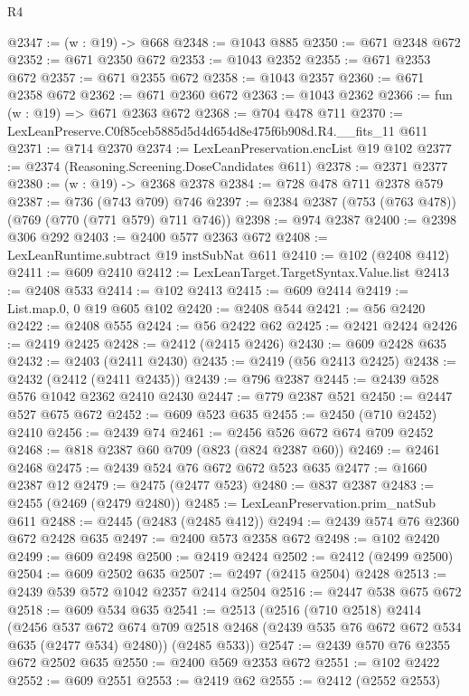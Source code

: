 \begin{lexlean}{R4}
\begin{coremodule}
@2347 := (w : @19) -> @668
@2348 := @1043 @885
@2350 := @671 @2348 @672
@2352 := @671 @2350 @672
@2353 := @1043 @2352
@2355 := @671 @2353 @672
@2357 := @671 @2355 @672
@2358 := @1043 @2357
@2360 := @671 @2358 @672
@2362 := @671 @2360 @672
@2363 := @1043 @2362
@2366 := fun (w : @19) => @671 @2363 @672
@2368 := @704 @478 @711
@2370 := LexLeanPreserve.C0f85ceb5885d5d4d654d8e475f6b908d.R4.__fits_11 @611
@2371 := @714 @2370
@2374 := LexLeanPreservation.encList @19 @102
@2377 := @2374 (Reasoning.Screening.DoseCandidates @611)
@2378 := @2371 @2377
@2380 := (w : @19) -> @2368 @2378
@2384 := @728 @478 @711 @2378 @579
@2387 := @736 (@743 @709) @746
@2397 := @2384 @2387 (@753 (@763 @478)) (@769 (@770 (@771 @579) @711 @746))
@2398 := @974 @2387
@2400 := @2398 @306 @292
@2403 := @2400 @577 @2363 @672
@2408 := LexLeanRuntime.subtract @19 instSubNat @611
@2410 := @102 (@2408 @412)
@2411 := @609 @2410
@2412 := LexLeanTarget.TargetSyntax.Value.list
@2413 := @2408 @533
@2414 := @102 @2413
@2415 := @609 @2414
@2419 := List.map.{0, 0} @19 @605 @102
@2420 := @2408 @544
@2421 := @56 @2420
@2422 := @2408 @555
@2424 := @56 @2422 @62
@2425 := @2421 @2424
@2426 := @2419 @2425
@2428 := @2412 (@2415 @2426)
@2430 := @609 @2428 @635
@2432 := @2403 (@2411 @2430)
@2435 := @2419 (@56 @2413 @2425)
@2438 := @2432 (@2412 (@2411 @2435))
@2439 := @796 @2387
@2445 := @2439 @528 @576 @1042 @2362 @2410 @2430
@2447 := @779 @2387 @521
@2450 := @2447 @527 @675 @672
@2452 := @609 @523 @635
@2455 := @2450 (@710 @2452) @2410
@2456 := @2439 @74
@2461 := @2456 @526 @672 @674 @709 @2452
@2468 := @818 @2387 @60 @709 (@823 (@824 @2387 @60))
@2469 := @2461 @2468
@2475 := @2439 @524 @76 @672 @672 @523 @635
@2477 := @1660 @2387 @12
@2479 := @2475 (@2477 @523)
@2480 := @837 @2387
@2483 := @2455 (@2469 (@2479 @2480))
@2485 := LexLeanPreservation.prim_natSub @611
@2488 := @2445 (@2483 (@2485 @412))
@2494 := @2439 @574 @76 @2360 @672 @2428 @635
@2497 := @2400 @573 @2358 @672
@2498 := @102 @2420
@2499 := @609 @2498
@2500 := @2419 @2424
@2502 := @2412 (@2499 @2500)
@2504 := @609 @2502 @635
@2507 := @2497 (@2415 @2504) @2428
@2513 := @2439 @539 @572 @1042 @2357 @2414 @2504
@2516 := @2447 @538 @675 @672
@2518 := @609 @534 @635
@2541 := @2513
    (@2516
      (@710 @2518)
      @2414
      (@2456
        @537
        @672
        @674
        @709
        @2518
        @2468
        (@2439 @535 @76 @672 @672 @534 @635 (@2477 @534) @2480))
      (@2485 @533))
@2547 := @2439 @570 @76 @2355 @672 @2502 @635
@2550 := @2400 @569 @2353 @672
@2551 := @102 @2422
@2552 := @609 @2551
@2553 := @2419 @62
@2555 := @2412 (@2552 @2553)

\end{coremodule}
\end{lexlean}
